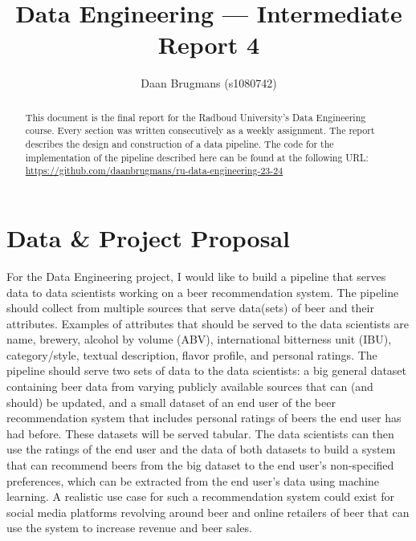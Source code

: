 \documentclass[sigconf, natbib=true]{acmart}
\begin{document}
\title{Data Engineering --- Intermediate Report 4}

\author{Daan Brugmans (s1080742)}

\begin{abstract}
    This document is the final report for the Radboud University's Data Engineering course.
    Every section was written consecutively as a weekly assignment.
    The report describes the design and construction of a data pipeline.
    The code for the implementation of the pipeline described here can be found at the following URL: \url{https://github.com/daanbrugmans/ru-data-engineering-23-24}
\end{abstract}

\maketitle
        


\section{Data \& Project Proposal}
For the Data Engineering project, I would like to build a pipeline that serves data to data scientists working on a beer recommendation system.
The pipeline should collect from multiple sources that serve data(sets) of beer and their attributes.
Examples of attributes that should be served to the data scientists are name, brewery, alcohol by volume (ABV), international bitterness unit (IBU), category/style, textual description, flavor profile, and personal ratings.
The pipeline should serve two sets of data to the data scientists: a big general dataset containing beer data from varying publicly available sources that can (and should) be updated, and a small dataset of an end user of the beer recommendation system that includes personal ratings of beers the end user has had before.
These datasets will be served tabular.
The data scientists can then use the ratings of the end user and the data of both datasets to build a system that can recommend beers from the big dataset to the end user's non-specified preferences, which can be extracted from the end user's data using machine learning.
A realistic use case for such a recommendation system could exist for social media platforms revolving around beer and online retailers of beer that can use the system to increase revenue and beer sales.
\end{document}
